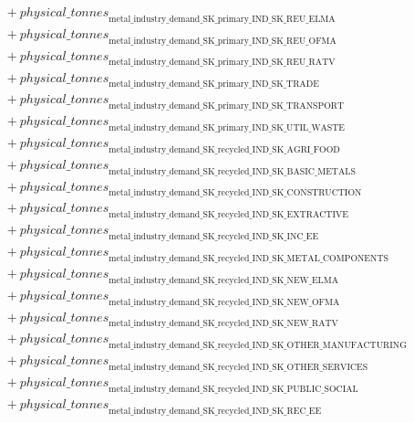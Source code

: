 \documentclass[11pt]{article}
\begin{document}
\begin{align*}
&\quad {}+ {physical\_tonnes}_{\text{metal\_industry\_demand\_SK\_primary\_IND\_SK\_REU\_ELMA}}\\
&\quad {}+ {physical\_tonnes}_{\text{metal\_industry\_demand\_SK\_primary\_IND\_SK\_REU\_OFMA}}\\
&\quad {}+ {physical\_tonnes}_{\text{metal\_industry\_demand\_SK\_primary\_IND\_SK\_REU\_RATV}}\\
&\quad {}+ {physical\_tonnes}_{\text{metal\_industry\_demand\_SK\_primary\_IND\_SK\_TRADE}}\\
&\quad {}+ {physical\_tonnes}_{\text{metal\_industry\_demand\_SK\_primary\_IND\_SK\_TRANSPORT}}\\
&\quad {}+ {physical\_tonnes}_{\text{metal\_industry\_demand\_SK\_primary\_IND\_SK\_UTIL\_WASTE}}\\
&\quad {}+ {physical\_tonnes}_{\text{metal\_industry\_demand\_SK\_recycled\_IND\_SK\_AGRI\_FOOD}}\\
&\quad {}+ {physical\_tonnes}_{\text{metal\_industry\_demand\_SK\_recycled\_IND\_SK\_BASIC\_METALS}}\\
&\quad {}+ {physical\_tonnes}_{\text{metal\_industry\_demand\_SK\_recycled\_IND\_SK\_CONSTRUCTION}}\\
&\quad {}+ {physical\_tonnes}_{\text{metal\_industry\_demand\_SK\_recycled\_IND\_SK\_EXTRACTIVE}}\\
&\quad {}+ {physical\_tonnes}_{\text{metal\_industry\_demand\_SK\_recycled\_IND\_SK\_INC\_EE}}\\
&\quad {}+ {physical\_tonnes}_{\text{metal\_industry\_demand\_SK\_recycled\_IND\_SK\_METAL\_COMPONENTS}}\\
&\quad {}+ {physical\_tonnes}_{\text{metal\_industry\_demand\_SK\_recycled\_IND\_SK\_NEW\_ELMA}}\\
&\quad {}+ {physical\_tonnes}_{\text{metal\_industry\_demand\_SK\_recycled\_IND\_SK\_NEW\_OFMA}}\\
&\quad {}+ {physical\_tonnes}_{\text{metal\_industry\_demand\_SK\_recycled\_IND\_SK\_NEW\_RATV}}\\
&\quad {}+ {physical\_tonnes}_{\text{metal\_industry\_demand\_SK\_recycled\_IND\_SK\_OTHER\_MANUFACTURING}}\\
&\quad {}+ {physical\_tonnes}_{\text{metal\_industry\_demand\_SK\_recycled\_IND\_SK\_OTHER\_SERVICES}}\\
&\quad {}+ {physical\_tonnes}_{\text{metal\_industry\_demand\_SK\_recycled\_IND\_SK\_PUBLIC\_SOCIAL}}\\
&\quad {}+ {physical\_tonnes}_{\text{metal\_industry\_demand\_SK\_recycled\_IND\_SK\_REC\_EE}}\\

\end{align*}
\end{document}
